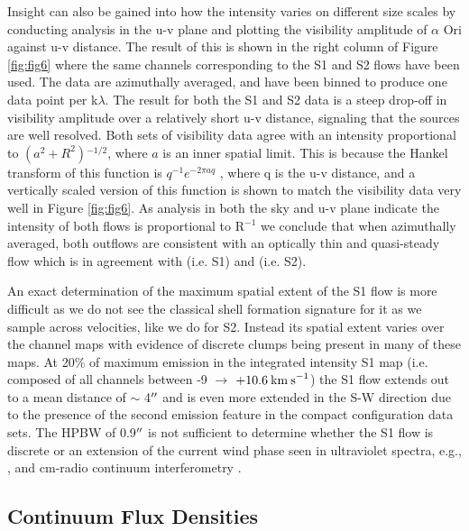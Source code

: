 \documentclass[iop]{emulateapj}
\begin{document}
Insight can also be gained into how the intensity varies on different size scales by conducting analysis in the u-v plane and plotting the visibility amplitude of $\alpha$ Ori against u-v distance. The result of this is shown in the right column of Figure \ref{fig:fig6} where the same channels corresponding to the S1 and S2 flows have been used. The data are azimuthally averaged, and have been binned to produce one data point per k$\lambda$. The result for both the S1 and S2 data is a steep drop-off in visibility amplitude over a relatively short u-v distance, signaling that the sources are well resolved. Both sets of visibility data agree with an intensity proportional to $(a^2 + R^2){}^{-1/2}$, where $a$ is an inner spatial limit. This is because the Hankel transform of this function is $q^{-1}e^{-2\pi aq}$ \citep{2000fta..book.....B}, where q is the u-v distance, and a vertically scaled version of this function is shown to match the visibility data very well in Figure \ref{fig:fig6}. As analysis in both the sky and u-v plane indicate the intensity of both flows is proportional to R${}^{-1}$ we conclude that when azimuthally averaged, both outflows are  consistent with an optically thin and quasi-steady flow which is in agreement with \cite{2009AJ....137.3558S} (i.e. S1) and \cite{2002A&A...386.1009P} (i.e. S2). 

An exact determination of the maximum spatial extent of the S1 flow is more difficult as we do not see the classical shell formation signature for it as we sample across velocities, like we do for S2. Instead its spatial extent varies over the channel maps with evidence of discrete clumps being present in many of these maps. At 20\% of maximum emission in the integrated intensity S1 map (i.e. composed of all channels between -9 $\rightarrow$ $+10.6\>{\rm km\>s}^{-1}$) the S1 flow extends out to a mean distance of $\sim$ 4$\mbox{$^{\prime\prime}$}$ and is even more extended in the S-W direction due to the presence of the second emission feature in the compact configuration data sets. The HPBW of 0.9$\mbox{$^{\prime\prime}$}$ is not sufficient to determine whether the S1 flow is discrete or an extension of the current wind phase seen in ultraviolet spectra, e.g., \cite{1997ApJ...479..970C}, and cm-radio continuum interferometry \citep{1998Natur.392..575L, harper_2001}.

\subsection{Continuum Flux Densities} \label{results4} 
\end{document}
